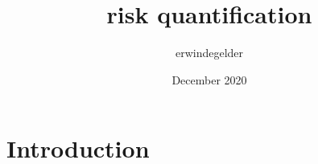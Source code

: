 \documentclass{article}
\title{risk quantification}
\author{erwindegelder }
\date{December 2020}
\begin{document}
\maketitle

\section{Introduction}
\end{document}
